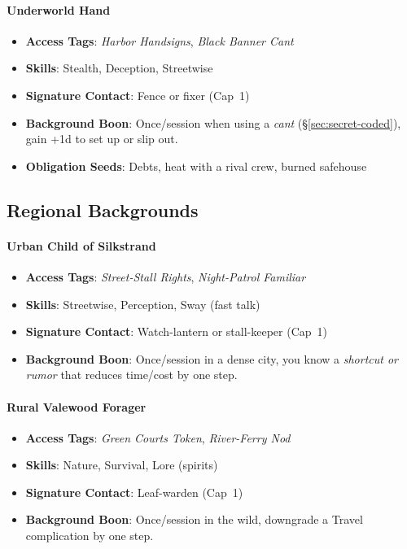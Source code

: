 \paragraph{Underworld Hand}
\begin{itemize}
\item \textbf{Access Tags}: \textit{Harbor Handsigns}, \textit{Black Banner Cant}
\item \textbf{Skills}: Stealth, Deception, Streetwise
\item \textbf{Signature Contact}: Fence or fixer (Cap~1)
\item \textbf{Background Boon}: Once/session when using a \emph{cant} (\S\ref{sec:secret-coded}), gain +1d to set up or slip out.
\item \textbf{Obligation Seeds}: Debts, heat with a rival crew, burned safehouse
\end{itemize}

\subsection*{Regional Backgrounds}

\paragraph{Urban Child of Silkstrand}
\begin{itemize}
\item \textbf{Access Tags}: \textit{Street-Stall Rights}, \textit{Night-Patrol Familiar}
\item \textbf{Skills}: Streetwise, Perception, Sway (fast talk)
\item \textbf{Signature Contact}: Watch-lantern or stall-keeper (Cap~1)
\item \textbf{Background Boon}: Once/session in a dense city, you know a \emph{shortcut or rumor} that reduces time/cost by one step.
\end{itemize}

\paragraph{Rural Valewood Forager}
\begin{itemize}
\item \textbf{Access Tags}: \textit{Green Courts Token}, \textit{River-Ferry Nod}
\item \textbf{Skills}: Nature, Survival, Lore (spirits)
\item \textbf{Signature Contact}: Leaf-warden (Cap~1)
\item \textbf{Background Boon}: Once/session in the wild, downgrade a Travel complication by one step.
\end{itemize}

